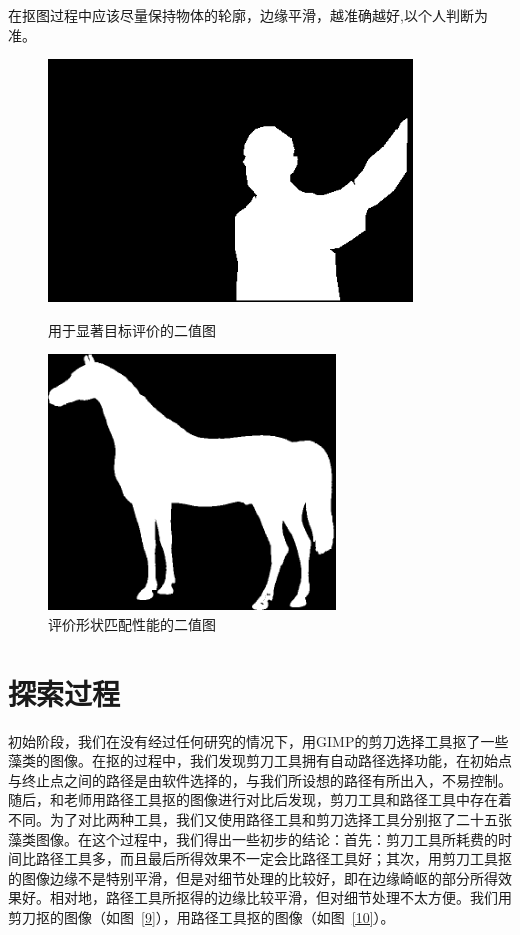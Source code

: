 \documentclass[12pt]{article}
\begin{document}
在抠图过程中应该尽量保持物体的轮廓，边缘平滑，越准确越好,以个人判断为准。

\begin{figure}[htbp]
\begin{minipage}{0.5\textwidth}
\centering
\includegraphics[width=3.8in]{11.png}
\caption{用于显著目标评价的二值图}
\label{6}
\end{minipage}
\begin{minipage}{0.5\textwidth}
\centering
\includegraphics[width=3.0in]{horse.png}
\caption{评价形状匹配性能的二值图}
\label{7}
\end{minipage}
\end{figure}

\section{探索过程}
\hspace{0.3in}初始阶段，我们在没有经过任何研究的情况下，用GIMP的剪刀选择工具抠了一些藻类的图像。在抠的过程中，我们发现剪刀工具拥有自动路径选择功能，在初始点与终止点之间的路径是由软件选择的，与我们所设想的路径有所出入，不易控制。\\

随后，和老师用路径工具抠的图像进行对比后发现，剪刀工具和路径工具中存在着不同。为了对比两种工具，我们又使用路径工具和剪刀选择工具分别抠了二十五张藻类图像。在这个过程中，我们得出一些初步的结论：首先：剪刀工具所耗费的时间比路径工具多，而且最后所得效果不一定会比路径工具好；其次，用剪刀工具抠的图像边缘不是特别平滑，但是对细节处理的比较好，即在边缘崎岖的部分所得效果好。相对地，路径工具所抠得的边缘比较平滑，但对细节处理不太方便。我们用剪刀抠的图像（如图~\ref{9}），用路径工具抠的图像（如图~\ref{10}）。\\
\end{document}
